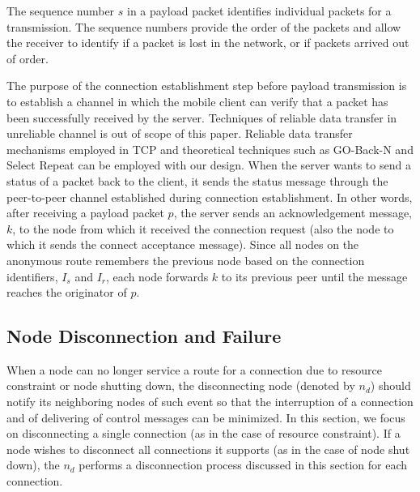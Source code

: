 The sequence number $s$ in a payload packet identifies individual packets
for a transmission. The sequence numbers provide the order of the packets
and allow the receiver to identify if a packet is lost in the network, or
if packets arrived out of order.

The purpose of the connection establishment step before payload transmission
is to establish a channel in which the mobile client can verify that a packet
has been successfully received by the server. Techniques of reliable data
transfer in unreliable channel is out of scope of this paper. Reliable data
transfer mechanisms employed in TCP\cite{RFC793} and theoretical techniques
such as GO-Back-N and Select Repeat\cite{book:Kurose} can be employed with
our design. When the server wants to send a status of a packet back to
the client, it sends the status message through the peer-to-peer channel
established during connection establishment. In other words, after receiving
a payload packet $p$, the server sends an acknowledgement message, $k$, to the
node from which it received the connection request (also the node to which
it sends the connect acceptance message). Since all nodes on the anonymous route
remembers the previous node based on the connection identifiers, $I_s$ and
$I_r$, each node forwards $k$ to its previous peer until the message
reaches the originator of $p$.


\subsection{Node Disconnection and Failure}

When a node can no longer service a route for a connection due to
resource constraint or node shutting down, the disconnecting node (denoted
by $n_d$)
should notify its neighboring nodes of such event so that the interruption
of a connection and of delivering of control messages can be minimized.
In this section, we focus on disconnecting a single connection (as in
the case of resource constraint). If a node wishes to disconnect all
connections it supports (as in the case of node shut down), the $n_d$
performs a disconnection process discussed in this section for each
connection.

